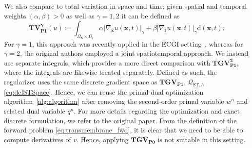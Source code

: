 \documentclass{article}
\newcommand{\dx}{\mathrm{d}}
\newcommand{\OmegaSpace}{\Omega_\mathbf{x}}
\newcommand{\OmegaTime}{\Omega_t}
\begin{document}
	We also compare to total variation in space and time; given spatial and temporal weights $(\alpha, \beta) > 0$ as well as $\gamma = 1, 2$ it can be defined as
	\begin{equation*}
		\mathbf{TV_{P1}^\gamma}(u) \coloneqq\int_{\OmegaSpace \times \OmegaTime} \alpha \vert \nabla_\mathbf{x}u(\mathbf{x}, t)\vert_\gamma + \beta\vert \nabla_\mathbf{t}u(\mathbf{x}, t)\vert_\gamma \dx (\mathbf{x}, t).
	\end{equation*}
	For $\gamma=1$, this approach was recently applied in the ECGI setting~\cite{Ha25}, whereas for $\gamma=2$, the original authors employed a joint spatiotemporal approach.
	We instead use separate integrals, which provides a more direct comparison with $\mathbf{TGV_{P1}^2}$, where the integrals are likewise treated separately.
	Defined as such, the regularizer uses the same discrete gradient space as $\mathbf{TGV_{P1}}$, $\mathcal{Q}_{\mathrm{ST}, h}$ \eqref{eq:defSTSpace}.
	Hence, we can reuse the primal-dual optimization algorithm~\cref{alg:algorithm} after removing the second-order primal variable $w^n$ and related dual variable $q^n$.
	For more details regarding the optimization and exact discrete formulation, we refer to the original paper.
	From the definition of the forward problem \eqref{eq:transmembrane_fwd}, it is clear that we need to be able to compute derivatives of $v$.
	Hence, applying $\mathbf{TGV_{P0}}$ is not suitable in this setting.
	
\end{document}
